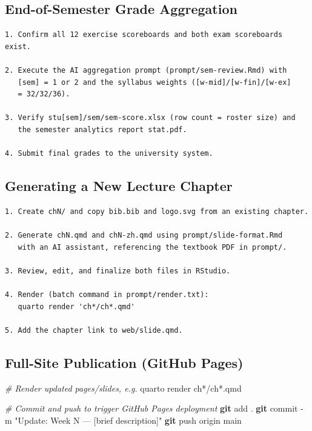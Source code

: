\documentclass[
]{article}
\newenvironment{Shaded}{\begin{snugshade}}{\end{snugshade}}
\newcommand{\AttributeTok}[1]{\textcolor[rgb]{0.13,0.29,0.53}{#1}}
\newcommand{\CommentTok}[1]{\textcolor[rgb]{0.56,0.35,0.01}{\textit{#1}}}
\newcommand{\ExtensionTok}[1]{#1}
\newcommand{\FunctionTok}[1]{\textcolor[rgb]{0.13,0.29,0.53}{\textbf{#1}}}
\newcommand{\NormalTok}[1]{#1}
\newcommand{\StringTok}[1]{\textcolor[rgb]{0.31,0.60,0.02}{#1}}
\begin{document}
\subsection{End-of-Semester Grade
Aggregation}\label{end-of-semester-grade-aggregation}

\begin{verbatim}
1. Confirm all 12 exercise scoreboards and both exam scoreboards exist.

2. Execute the AI aggregation prompt (prompt/sem-review.Rmd) with
   [sem] = 1 or 2 and the syllabus weights ([w-mid]/[w-fin]/[w-ex]
   = 32/32/36).

3. Verify stu[sem]/sem/sem-score.xlsx (row count = roster size) and
   the semester analytics report stat.pdf.

4. Submit final grades to the university system.
\end{verbatim}

\subsection{Generating a New Lecture
Chapter}\label{generating-a-new-lecture-chapter}

\begin{verbatim}
1. Create chN/ and copy bib.bib and logo.svg from an existing chapter.

2. Generate chN.qmd and chN-zh.qmd using prompt/slide-format.Rmd
   with an AI assistant, referencing the textbook PDF in prompt/.

3. Review, edit, and finalize both files in RStudio.

4. Render (batch command in prompt/render.txt):
   quarto render 'ch*/ch*.qmd'

5. Add the chapter link to web/slide.qmd.
\end{verbatim}

\subsection{Full-Site Publication (GitHub
Pages)}\label{full-site-publication-github-pages}

\begin{Shaded}
\begin{Highlighting}[]
\CommentTok{\# Render updated pages/slides, e.g.}
\ExtensionTok{quarto}\NormalTok{ render }\StringTok{\textquotesingle{}ch*/ch*.qmd\textquotesingle{}}

\CommentTok{\# Commit and push to trigger GitHub Pages deployment}
\FunctionTok{git}\NormalTok{ add .}
\FunctionTok{git}\NormalTok{ commit }\AttributeTok{{-}m} \StringTok{"Update: Week N — [brief description]"}
\FunctionTok{git}\NormalTok{ push origin main}
\end{Highlighting}
\end{Shaded}
\end{document}
